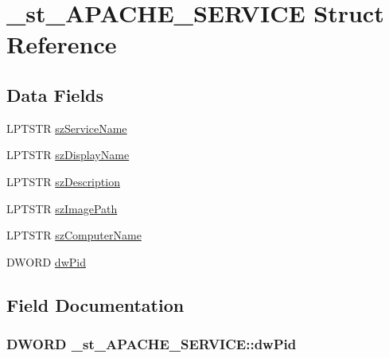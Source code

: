 \hypertarget{struct__st__APACHE__SERVICE}{}\section{\+\_\+st\+\_\+\+A\+P\+A\+C\+H\+E\+\_\+\+S\+E\+R\+V\+I\+CE Struct Reference}
\label{struct__st__APACHE__SERVICE}
\subsection*{Data Fields}
\begin{DoxyCompactItemize}
\item 
L\+P\+T\+S\+TR \hyperlink{struct__st__APACHE__SERVICE_a756538030779a2025623fc3c912b3f91}{sz\+Service\+Name}
\item 
L\+P\+T\+S\+TR \hyperlink{struct__st__APACHE__SERVICE_ae5f342ed4cfbad958dd7330114597eec}{sz\+Display\+Name}
\item 
L\+P\+T\+S\+TR \hyperlink{struct__st__APACHE__SERVICE_acd91910e4b38f7fe63926261d0a5a99c}{sz\+Description}
\item 
L\+P\+T\+S\+TR \hyperlink{struct__st__APACHE__SERVICE_a9e6fb4545b06aaccfc65e0120eaf6747}{sz\+Image\+Path}
\item 
L\+P\+T\+S\+TR \hyperlink{struct__st__APACHE__SERVICE_a2c63f69de82f6d93af658f954f104a66}{sz\+Computer\+Name}
\item 
D\+W\+O\+RD \hyperlink{struct__st__APACHE__SERVICE_a858984fae9c8b0508647035c3917029b}{dw\+Pid}
\end{DoxyCompactItemize}


\subsection{Field Documentation}
\subsubsection[{\texorpdfstring{dw\+Pid}{dwPid}}]{\setlength{\rightskip}{0pt plus 5cm}D\+W\+O\+RD \+\_\+st\+\_\+\+A\+P\+A\+C\+H\+E\+\_\+\+S\+E\+R\+V\+I\+C\+E\+::dw\+Pid}\hypertarget{struct__st__APACHE__SERVICE_a858984fae9c8b0508647035c3917029b}{}\label{struct__st__APACHE__SERVICE_a858984fae9c8b0508647035c3917029b}
